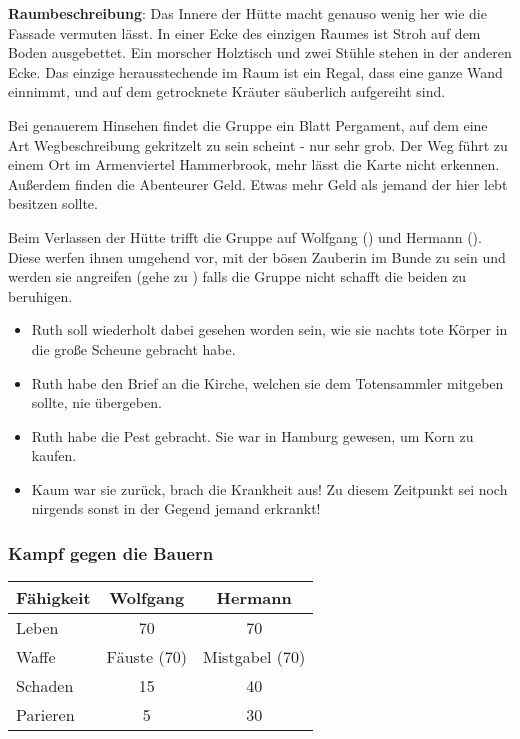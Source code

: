 \textbf{Raumbeschreibung}: Das Innere der Hütte macht genauso wenig her wie die Fassade vermuten lässt. In einer Ecke des einzigen Raumes ist Stroh auf dem Boden ausgebettet. Ein morscher Holztisch und zwei Stühle stehen in der anderen Ecke. Das einzige herausstechende im Raum ist ein Regal, dass eine ganze Wand einnimmt, und auf dem getrocknete Kräuter säuberlich aufgereiht sind.

Bei genauerem Hinsehen findet die Gruppe ein Blatt Pergament, auf dem eine Art Wegbeschreibung gekritzelt zu sein scheint - nur sehr grob. Der Weg führt zu einem Ort im Armenviertel Hammerbrook, mehr lässt die Karte nicht erkennen. Außerdem finden die Abenteurer Geld. Etwas mehr Geld als jemand der hier lebt besitzen sollte.

Beim Verlassen der Hütte trifft die Gruppe auf Wolfgang (\blue{\ref{Wolfgang}}) und Hermann (\blue{\ref{Hermann}}). Diese werfen ihnen umgehend vor, mit der bösen Zauberin im Bunde zu sein und werden sie angreifen (gehe zu \blue{\ref{kampf}}) falls die Gruppe nicht schafft die beiden zu beruhigen.


\begin{itemize}
  \item Ruth soll wiederholt dabei gesehen worden sein, wie sie nachts tote Körper in die große Scheune gebracht habe.
  \item Ruth habe den Brief an die Kirche, welchen sie dem Totensammler mitgeben sollte, nie übergeben.
  \item Ruth habe die Pest gebracht. Sie war in Hamburg gewesen, um Korn zu kaufen.
  \item Kaum war sie zurück, brach die Krankheit aus! Zu diesem Zeitpunkt sei noch nirgends sonst in der Gegend jemand erkrankt!
\end{itemize}

\subsubsection*{Kampf gegen die Bauern}
\label{kampf}

\begin{center}
  \begin{tabular}{lcc}

    \toprule
    Fähigkeit & \textbf{Wolfgang} & \textbf{Hermann} \\
    \midrule
    Leben & 70 & 70 \\
    Waffe & Fäuste (70) & Mistgabel (70) \\
    Schaden & 15 & 40 \\
    Parieren & 5 & 30 \\
    \bottomrule
  \end{tabular}
\end{center}



